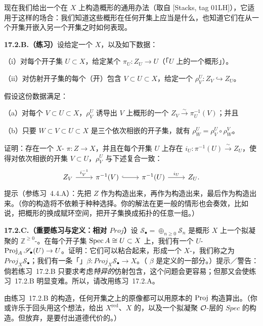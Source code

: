 现在我们给出一个在 $X$ 上构造概形的通用办法（取自 [Stacks, tag 01LH]），它适用于这样的场合：我们知道这些概形在任何\trAffine{}开集上应当是什么，也知道它们在从一个\trAffine{}开集开嵌入另一个\trAffine{}开集之时如何表现。

\textbf{17.2.B.（练习）}\quad 设给定一个\trScheme{} $X$，以及如下数据：

（i）对每个\trAffine{}开子集 $U\subset X$，给定某个\trMorphism{} $\pi_U\colon Z_U\to U$（「$U$ 上的一个概形」）。

（ii）对仿射开子集的每个（开）包含 $V\subset U\subset X$，给定一个\trOpenEmbedding{} $\rho^U_V\colon Z_V\hookrightarrow Z_U$。

假设这份数据满足：

（a）对每个 $V\subset U\subset X$，$\rho^U_V$ 诱导出 $V$ 上概形的一个\trIsomorphism{} $Z_V\overset{\sim}{\longrightarrow}\pi_U^{-1}(V)$；并且

（b）只要 $W\subset V\subset U\subset X$ 是三个依次相嵌的\trAffine{}开子集，就有 $\rho^U_W=\rho^U_V\circ\rho^V_W$。

证明：存在一个 $X$-\trScheme{} $\pi\colon Z\to X$，并且在每个\trAffine{}开集 $U$ 上存在\trIsomorphism{} $i_U\colon\pi^{-1}(U)\overset{\sim}{\longrightarrow}Z_U$，使得对依次相嵌的\trAffine{}开集 $V\subset U$，$\rho^U_V$ 与下述复合一致：
\[
\begin{tikzcd}
Z_V \ar[r, "i_V^{-1}"] & \pi^{-1}(V) \ar[r, hook] & \pi^{-1}(U) \ar[r, "i_U"] & Z_U.
\end{tikzcd}
\]
提示（参\mbox{练习~4.4.A}）：先把 $Z$ 作为\trSet{}构造出来，再作为\trTopologicalSpace{}构造出来，最后作为\trScheme{}构造出来。（你的构造将不依赖于种种选择。你的解法在更一般的情形也会奏效，比如说，把概形的\trCategory{}换成赋环空间，把\trAffine{}开子集换成拓扑的任意一组\trBase。）

\textbf{17.2.C.（重要练习与定义：相对 $\mathit{Proj}$）}\quad 设 $\mathscr{S}_\bullet=\oplus_{n\ge0}\mathscr{S}_n$ 是概形 $X$ 上一个拟凝聚的 $\mathbb{Z}^{\ge0}$-\trSheafOfGradedAlgebras。在每个\trAffine{}开子集 $\operatorname{Spec} A\cong U\subset X$ 上，我们有一个 $U$-\trScheme{} $\operatorname{Proj}_A\mathscr{S}_\bullet(U)\to U$。证明：它们可以粘合起来，形成一个 $X$-\trScheme，我们称之为 $\mathit{Proj}_X\mathscr{S}_\bullet$；我们有一条「\trStructureMorphism」$\beta\colon\mathit{Proj}_X\mathscr{S}_\bullet\to X$。（\trStructureMorphism{} $\beta$ 是定义的一部分。）提示／警告：倘若\mbox{练习~17.2.B} 只要求考虑\emph{特异的}仿射包含，这个问题会更容易；但那又会使\mbox{练习~17.2.B} 明显变难。所以，请改用\mbox{练习~17.2.A}。

由\mbox{练习~17.2.B} 的构造，任何\trAffine{}开集之上的原像都可以用原本的 $\operatorname{Proj}$ 构造算出。（你或许乐于回头用这个想法，给出 $X^{\mathrm{red}}$、$X$ 的\trNormalization，以及一个拟凝聚 $\mathcal{O}$-\trAlgebra{}层的 $\mathit{Spec}$ 的构造。但放弃\trUniversalProperty{}，是要付出道德代价的。）

